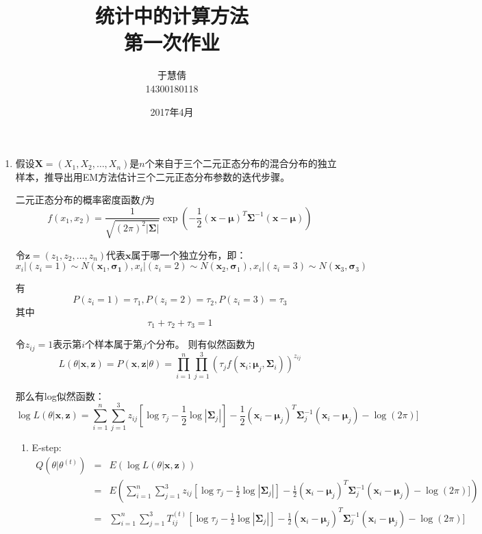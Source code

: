 \documentclass{ctexart}
\begin{document}
\title{统计中的计算方法 \\ 第一次作业}

\author{于慧倩 \\ 14300180118}

\date{2017年4月}


\maketitle

\newpage

\begin{enumerate}

\item
假设\(\bm{X}=(X_1,X_2,\dots,X_n)\)是\(n\)个来自于三个二元正态分布的混合分布的独立样本，推导出用EM方法估计三个二元正态分布参数的迭代步骤。

二元正态分布的概率密度函数\(f\)为
\[ f(x_1,x_2)=\frac{1}{\sqrt{(2 \pi)^2|\bm{\Sigma}|}}\exp(-\frac{1}{2}(\bm{x}-\bm{\mu})^T \bm{\Sigma}^{-1} (\bm{x}-\bm{\mu}))\]

令\(\bm{z}=(z_1,z_2,\dots,z_n)\)代表\(\bm{x}\)属于哪一个独立分布，即：
\[
x_i|(z_i=1) \sim N(\bm{x}_1,\bm{\sigma_1}),
x_i|(z_i=2) \sim N(\bm{x}_2,\bm{\sigma}_1),
x_i|(z_i=3) \sim N(\bm{x}_3,\bm{\sigma}_3)\]

有
\[
P(z_i=1)=\tau_1,P(z_i=2)=\tau_2,P(z_i=3)=\tau_3\]
其中
\[\tau_1+\tau_2+\tau_3=1\]

令\(z_{ij}=1\)表示第\(i\)个样本属于第\(j\)个分布。
则有似然函数为
\[ L( \theta |\bm{x},\bm{z})=P(\bm{x},\bm{z}|\theta)= \prod_{i=1}^n \prod_{j=1}^3 (\tau_j f( \bm{x}_i;\bm{\mu}_j,\bm{\Sigma}_i))^{z_{ij}} \]

那么有log似然函数：
\[
\log L(\theta|\bm{x},\bm{z})=\sum_{i=1}^n \sum_{j=1}^3 z_{ij} [ \log{ \tau_j} - \frac{1}{2} \log|\bm{\Sigma}_j |]-\frac{1}{2}(\bm{x}_i-\bm{\mu}_j)^T \bm{\Sigma}_j^{-1} (\bm{x}_i-\bm{\mu}_j)-\log(2 \pi)]\]

\begin{enumerate}


\item E-step:
\begin{eqnarray*}
Q(\theta | \theta^{(t)})&=&E(\log L(\theta|\bm{x},\bm{z})) \\
&=&E(\sum_{i=1}^n \sum_{j=1}^3 z_{ij} [ \log{ \tau_j} - \frac{1}{2} \log|\bm{\Sigma}_j |]-\frac{1}{2}(\bm{x}_i-\bm{\mu}_j)^T \bm{\Sigma}_j^{-1} (\bm{x}_i-\bm{\mu}_j)-\log(2 \pi)])\\
&=& \sum_{i=1}^n \sum_{j=1}^3 T_{ij}^{(t)} [ \log{ \tau_j} - \frac{1}{2} \log|\bm{\Sigma}_j |]-\frac{1}{2}(\bm{x}_i-\bm{\mu}_j)^T \bm{\Sigma}_j^{-1} (\bm{x}_i-\bm{\mu}_j)-\log(2 \pi)]
\end{eqnarray*}


\end{enumerate}
\end{enumerate}
\end{document}
